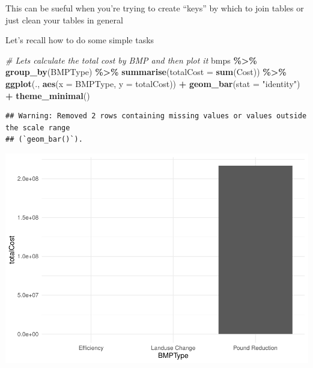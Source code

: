\documentclass[]{article}
\newenvironment{Shaded}{\begin{snugshade}}{\end{snugshade}}
\newcommand{\AttributeTok}[1]{\textcolor[rgb]{0.13,0.29,0.53}{#1}}
\newcommand{\CommentTok}[1]{\textcolor[rgb]{0.56,0.35,0.01}{\textit{#1}}}
\newcommand{\FunctionTok}[1]{\textcolor[rgb]{0.13,0.29,0.53}{\textbf{#1}}}
\newcommand{\NormalTok}[1]{#1}
\newcommand{\SpecialCharTok}[1]{\textcolor[rgb]{0.81,0.36,0.00}{\textbf{#1}}}
\newcommand{\StringTok}[1]{\textcolor[rgb]{0.31,0.60,0.02}{#1}}
\begin{document}
This can be sueful when you're trying to create ``keys'' by which to
join tables or just clean your tables in general

Let's recall how to do some simple tasks

\begin{Shaded}
\begin{Highlighting}[]
\CommentTok{\# Let\textquotesingle{}s calculate the total cost by BMP and then plot it}
\NormalTok{bmps }\SpecialCharTok{\%\textgreater{}\%} \FunctionTok{group\_by}\NormalTok{(BMPType) }\SpecialCharTok{\%\textgreater{}\%} \FunctionTok{summarise}\NormalTok{(}\AttributeTok{totalCost =} \FunctionTok{sum}\NormalTok{(Cost)) }\SpecialCharTok{\%\textgreater{}\%}
  \FunctionTok{ggplot}\NormalTok{(., }\FunctionTok{aes}\NormalTok{(}\AttributeTok{x =}\NormalTok{ BMPType, }\AttributeTok{y =}\NormalTok{ totalCost)) }\SpecialCharTok{+}
  \FunctionTok{geom\_bar}\NormalTok{(}\AttributeTok{stat =} \StringTok{"identity"}\NormalTok{) }\SpecialCharTok{+}
  \FunctionTok{theme\_minimal}\NormalTok{()}
\end{Highlighting}
\end{Shaded}

\begin{verbatim}
## Warning: Removed 2 rows containing missing values or values outside the scale range
## (`geom_bar()`).
\end{verbatim}

\includegraphics{lab02_files/figure-latex/review-1.pdf}

\begin{Shaded}
\end{Shaded}
\end{document}
